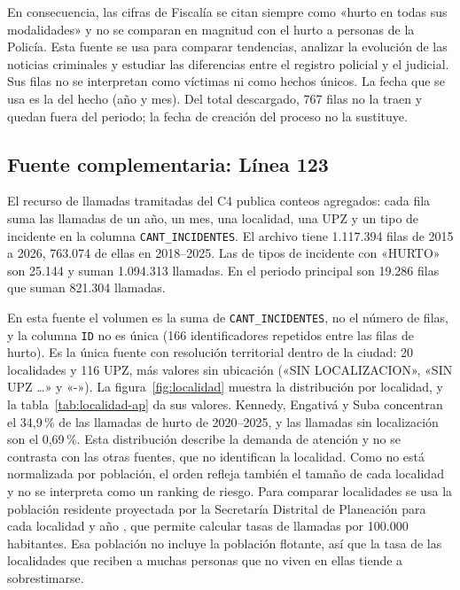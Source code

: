 En consecuencia, las cifras de Fiscalía se citan siempre como «hurto en todas sus modalidades» y no se comparan en magnitud con el hurto a personas de la Policía. Esta fuente se usa para comparar tendencias, analizar la evolución de las noticias criminales y estudiar las diferencias entre el registro policial y el judicial. Sus filas no se interpretan como víctimas ni como hechos únicos. La fecha que se usa es la del hecho (año y mes). Del total descargado, 767 filas no la traen y quedan fuera del periodo; la fecha de creación del proceso no la sustituye.

\subsection{Fuente complementaria: Línea 123}

El recurso de llamadas tramitadas del C4 publica conteos agregados: cada fila suma las llamadas de un año, un mes, una localidad, una UPZ y un tipo de incidente en la columna \texttt{CANT\_INCIDENTES}. El archivo tiene 1.117.394 filas de 2015 a 2026, 763.074 de ellas en 2018--2025. Las de tipos de incidente con «HURTO» son 25.144 y suman 1.094.313 llamadas. En el periodo principal son 19.286 filas que suman 821.304 llamadas.

En esta fuente el volumen es la suma de \texttt{CANT\_INCIDENTES}, no el número de filas, y la columna \texttt{ID} no es única (166 identificadores repetidos entre las filas de hurto). Es la única fuente con resolución territorial dentro de la ciudad: 20 localidades y 116 UPZ, más valores sin ubicación («SIN LOCALIZACION», «SIN UPZ \ldots» y «-»). La figura~\ref{fig:localidad} muestra la distribución por localidad, y la tabla~\ref{tab:localidad-ap} da sus valores. Kennedy, Engativá y Suba concentran el 34,9\,\% de las llamadas de hurto de 2020--2025, y las llamadas sin localización son el 0,69\,\%. Esta distribución describe la demanda de atención y no se contrasta con las otras fuentes, que no identifican la localidad. Como no está normalizada por población, el orden refleja también el tamaño de cada localidad y no se interpreta como un ranking de riesgo. Para comparar localidades se usa la población residente proyectada por la Secretaría Distrital de Planeación para cada localidad y año \citep{sdp2025}, que permite calcular tasas de llamadas por 100.000 habitantes. Esa población no incluye la población flotante, así que la tasa de las localidades que reciben a muchas personas que no viven en ellas tiende a sobrestimarse.

